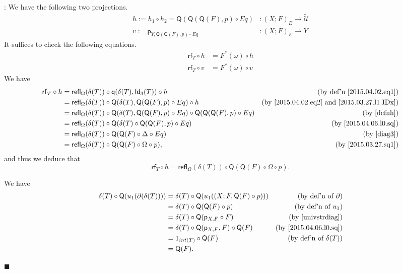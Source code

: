\documentclass[12pt]{article}
\numberwithin{equation}{section}
\newenvironment{eq}{\begin{equation}}{\end{equation}}
\newenvironment{myproof}{{\bf Proof}:}{$\blacksquare$ \vskip 5mm }
\newcommand{\by}[1]{\text{(by #1)}}
\newcommand{\sr}{\rightarrow}
\newcommand{\wt}{\widetilde}
\newcommand{\id}{1}            %
\newcommand{\p}{\mathsf{p}}
\newcommand{\q}{\mathsf{q}}
\newcommand{\Idx}{\mathsf{Id}_3} %
\newcommand{\refl}{\mathsf{refl}}
\newcommand{\U}{\mathcal{U}}
\newcommand{\rf}{\mathsf{rf}}
\newcommand{\Q}{\mathsf{Q}}
\begin{document}
\begin{myproof}
We have the following two projections.
%
\begin{align}
  h := h_1\circ h_2=\Q(\Q(\Q(F),p)\circ Eq)&:(X;F)_{E}\sr \wt{\U} \label{defnh} \\
  v := \p_{Y,\Q(\Q(F),p)\circ Eq}&:(X;F)_{E} \sr Y                \label{defnv}
\end{align}
%
It suffices to check the following equations.
%
\begin{align*}
  \rf_T\circ h &=F^*(\omega)\circ h \\
  \rf_T\circ v &=F^*(\omega)\circ v
\end{align*}
%
We have
%
\begin{align*}
  \rf_T \circ h
  & = \refl_\Omega(\delta(T))\circ \q(\delta(T),\Idx(T))         \circ h & \by{def'n \ref{2015.04.02.eq1}} \\
  & = \refl_\Omega(\delta(T))\circ \Q(\delta(T),\Q(\Q(F),p)      \circ Eq) \circ h & \by{\ref{2015.04.02.eq2} and \ref{2015.03.27.l1-IDx}} \\
  & = \refl_\Omega(\delta(T))\circ \Q(\delta(T),\Q(\Q(F),p)      \circ Eq) \circ \Q(\Q(\Q(F),p)\circ Eq) & \by{\ref{defnh}} \\
  & = \refl_\Omega(\delta(T))\circ \Q(\delta(T)\circ \Q(\Q(F),p) \circ Eq) & \by{\ref{2015.04.06.l0.sq}}\\
  & = \refl_\Omega(\delta(T))\circ \Q(\Q(F)\circ \Delta          \circ Eq) & \by{\ref{diag3}}\\
  & = \refl_\Omega(\delta(T))\circ \Q(\Q(F)\circ \Omega          \circ p), & \by{\ref{2015.03.27.sq1}}
\end{align*}
and thus we deduce that
\begin{eq}
  \label{eqnrfth}
  \rf_T \circ h = \refl_\Omega(\delta(T))\circ \Q(\Q(F)\circ \Omega \circ p).
\end{eq}

%

We have
%
\begin{align*}
        \delta(T) \circ \Q(u_1(\partial(\delta(T)))) 
    & = \delta(T) \circ \Q(u_1((X;F,\Q(F) \circ p))) & \by{def'n of $\partial$} \\
    & = \delta(T) \circ \Q(\Q(F) \circ p)            & \by{def'n of $u_1$} \\
    & = \delta(T) \circ \Q(\p_{X,F} \circ F)         & \by{\ref{univstrdiag}} \\
    & = \delta(T) \circ \Q(\p_{X,F},F) \circ \Q(F)   & \by{\ref{2015.04.06.l0.sq}} \\
    & = \id_{int(T)} \circ \Q(F)                     & \by{def'n of $\delta(T)$} \\
    & = \Q(F).                                       &
\end{align*}
%


\end{myproof}
\end{document}
